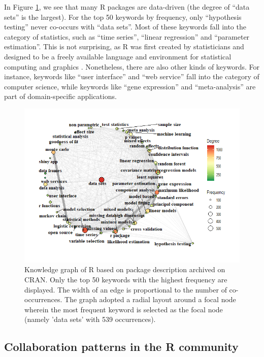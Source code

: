 In Figure \ref{fig:fig5}, we see that many R packages are data-driven
(the degree of ``data sets'' is the largest). For the top 50 keywords by
frequency, only ``hypothesis testing'' never co-occurs with ``data
sets''. Most of these keywords fall into the category of statistics,
such as ``time series'', ``linear regression'' and ``parameter
estimation''. This is not surprising, as R was first created by
statisticians and designed to be a freely available language and
environment for statistical computing and graphics
\citep{IhakaGentleman-501}. Nonetheless, there are also other kinds of
keywords. For instance, keywords like ``user interface'' and ``web
service'' fall into the category of computer science, while keywords
like ``gene expression'' and ``meta-analysis'' are part of
domain-specific applications.

\begin{Schunk}
\begin{figure}
\includegraphics[width=1\linewidth,height=0.4\textheight]{fig5} \caption[Knowledge graph of R based on package description archived on CRAN]{Knowledge graph of R based on package description archived on CRAN. Only the top 50 keywords with the highest frequency are displayed. The width of an edge is proportional to the number of co-occurrences. The graph adopted a radial layout around a focal node wherein the most frequent keyword is selected as the focal node (namely 'data sets' with 539 occurrences). }\label{fig:fig5}
\end{figure}
\end{Schunk}

\hypertarget{collaboration-patterns-in-the-r-community}{%
\subsection{Collaboration patterns in the R
community}\label{collaboration-patterns-in-the-r-community}}


